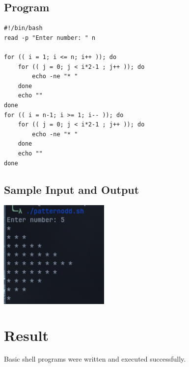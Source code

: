 \subsection{Program}
\begin{lstlisting}[label={list:program:pass_fail}]
#!/bin/bash
read -p "Enter number: " n

for (( i = 1; i <= n; i++ )); do
	for (( j = 0; j < i*2-1 ; j++ )); do
		echo -ne "* "
	done
	echo ""
done
for (( i = n-1; i >= 1; i-- )); do
	for (( j = 0; j < i*2-1 ; j++ )); do
		echo -ne "* "
	done
	echo ""
done
\end{lstlisting}
\subsection{Sample Input and Output}
\includegraphics[]{Cycle_1//Outputs/pattrn.png}

\section{Result}
Basic shell programs were written and executed successfully.